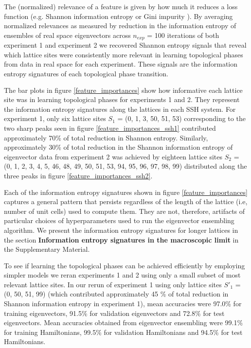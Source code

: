 \documentclass[10pt]{revtex4-1}
\begin{document}
The (normalized) relevance of a feature is given by how much it reduces a loss function (e.g. Shannon information entropy or Gini impurity \cite{friedman2001elements}). By averaging normalized relevances as measured by reduction in the information entropy of ensembles of real space eigenvectors across $n_{exp}$ = 100 iterations of both experiment 1 and experiment 2 we recovered Shannon entropy signals that reveal which lattice sites were consistently more relevant in learning topological phases from data in real space for each experiment. These signals are the information entropy signatures of each topological phase transition. 

The bar plots in figure \ref{feature_importances} show how informative each lattice site was in learning topological phases for experiments 1 and 2. They represent the information entropy signatures along the lattices in each SSH system. For experiment 1, only six lattice sites $S_1$ = (0, 1, 3, 50, 51, 53) corresponding to the two sharp peaks seen in figure \ref{feature_importances_ssh1} contributed approximately 70\% of total reduction in Shannon entropy. Similarly, approximately 30\% of total reduction in the Shannon information entropy of eigenvector data from experiment 2 was achieved by eighteen lattice sites $S_2$ = (0, 1, 2, 3, 4, 5, 46, 48, 49, 50, 51, 53, 94, 95, 96, 97, 98, 99) distributed along the three peaks in figure \ref{feature_importances_ssh2}.

Each of the information entropy signatures shown in figure \ref{feature_importances} captures a general pattern that persists regardless of the length of the lattice (i.e, number of unit cells) used to compute them. They are not, therefore, artifacts of particular choices of hyperparameters used to run the eigenvector ensembling algorithm. We present the information entropy signatures for longer lattices in the section \textbf{Information entropy signatures in the macroscopic limit} in the Supplementary Material.

To see if learning the topological phases can be achieved efficiently by employing simpler models we reran experiments 1 and 2 using only a small subset of most relevant lattice sites. In our rerun of experiment 1 using only lattice sites $S'_1$ = (0, 50, 51, 99) (which contributed approximately 45 \% of total reduction in Shannon information entropy in experiment 1), mean accuracies were 97.0\% for training eigenvectors, 91.5\% for validation eigenvectors and 72.8\% for test eigenvectors. Mean accuracies obtained from eigenvector ensembling were 99.1\% for training Hamiltonians, 99.5\% for validation Hamiltonians and 94.5\% for test Hamiltonians.
\end{document}
